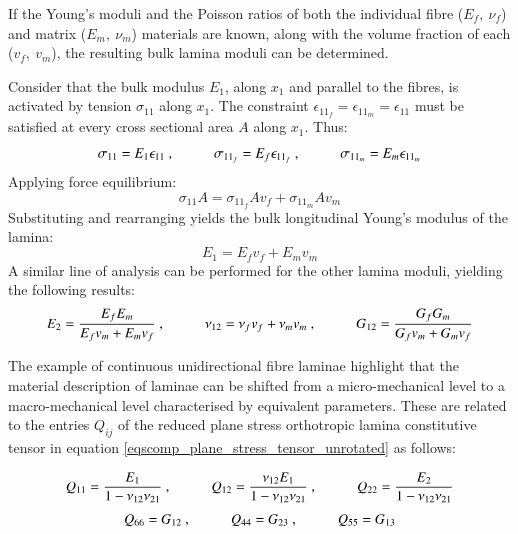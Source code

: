 If the Young's moduli and the Poisson ratios of both the individual fibre ($E_f,\ \nu_f$) and matrix ($E_m,\ \nu_m$) materials are known, along with the volume fraction of each ($v_f,\ v_m$), the resulting bulk lamina moduli can be determined. 

Consider that the bulk modulus $E_1$, along $x_1$ and parallel to the fibres, is activated by tension $\sigma_{11}$ along $x_1$. The constraint $\epsilon_{11_f} = \epsilon_{11_m} = \epsilon_{11}$ must be satisfied at every cross sectional area $A$ along $x_1$. Thus:
\begin{equation} 
\sigma_{11} = E_1\epsilon_{11}\ ,
\hspace{10mm}
\sigma_{11_f} = E_f\epsilon_{11_f}\ ,
\hspace{10mm}
\sigma_{11_m} = E_m\epsilon_{11_m}
\label{eqscomp5}
\end{equation}
Applying force equilibrium:
\begin{equation} 
\sigma_{11}A = \sigma_{11_f}A v_f + \sigma_{11_m}A v_m
\label{eqscomp6}
\end{equation}
Substituting and rearranging yields the bulk longitudinal Young's modulus of the lamina:
\begin{equation} 
E_1 = E_f v_f + E_m v_m
\label{eqscomp7}
\end{equation}
A similar line of analysis can be performed for the other lamina moduli, yielding the following results:
\begin{equation} 
E_2 = \frac{E_f E_m}{E_f v_m + E_m v_f}\ ,
\hspace{10mm}
\nu_{12} = \nu_f v_f + \nu_m v_m\ ,
\hspace{10mm}
G_{12} = \frac{G_f G_m}{G_f v_m + G_m v_f}
\label{eqscomp8}
\end{equation}

The example of continuous unidirectional fibre laminae highlight that the material description of laminae can be shifted from a micro-mechanical level to a macro-mechanical level characterised by equivalent parameters. These are related to the entries $Q_{ij}$ of the reduced plane stress orthotropic lamina constitutive tensor in equation \ref{eqscomp_plane_stress_tensor_unrotated} as follows:

\begin{equation} 
Q_{11} = \frac{E_1}{1-\nu_{12} \nu_{21}}\ ,
\hspace{10mm}
Q_{12} = \frac{\nu_{12} E_1}{1-\nu_{12} \nu_{21}}\ ,
\hspace{10mm}
Q_{22} = \frac{E_2}{1-\nu_{12} \nu_{21}}
\label{eqscomp9}
\end{equation}
\begin{equation} 
Q_{66} = G_{12}\ ,
\hspace{10mm}
Q_{44} = G_{23}\ ,
\hspace{10mm}
Q_{55} = G_{13}
\label{eqscomp10}
\end{equation}

